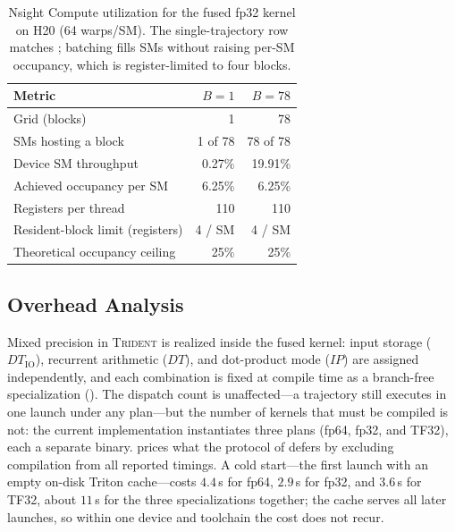 \begin{table}[!t]
  \centering
  \caption{Nsight Compute utilization for the fused fp32 kernel on H20 (64 warps/SM). The single-trajectory row matches ; batching fills SMs without raising per-SM occupancy, which is register-limited to four blocks.}
  \label{tab:ablation-profiling}
  \begin{tabular}{@{}lrr@{}}
    \toprule
    Metric & $B{=}1$ & $B{=}78$ \\
    \midrule
    Grid (blocks) & 1 & 78 \\
    SMs hosting a block & 1 of 78 & 78 of 78 \\
    Device SM throughput & 0.27\% & 19.91\% \\
    Achieved occupancy per SM & 6.25\% & 6.25\% \\
    Registers per thread & 110 & 110 \\
    Resident-block limit (registers) & 4 / SM & 4 / SM \\
    Theoretical occupancy ceiling & 25\% & 25\% \\
    \bottomrule
  \end{tabular}
\end{table}

\subsection{Overhead Analysis}
\label{subsec:overhead}

Mixed precision in \textsc{Trident} is realized inside the fused kernel: input storage ($\mathit{DT}_{\mathrm{IO}}$), recurrent arithmetic ($\mathit{DT}$), and dot-product mode ($\mathit{IP}$) are assigned independently, and each combination is fixed at compile time as a branch-free specialization (). The dispatch count is unaffected---a trajectory still executes in one launch under any plan---but the number of kernels that must be compiled is not: the current implementation instantiates three plans (fp64, fp32, and TF32), each a separate binary.  prices what the protocol of  defers by excluding compilation from all reported timings. A cold start---the first launch with an empty on-disk Triton cache---costs $4.4$\,s for fp64, $2.9$\,s for fp32, and $3.6$\,s for TF32, about $11$\,s for the three specializations together; the cache serves all later launches, so within one device and toolchain the cost does not recur.

